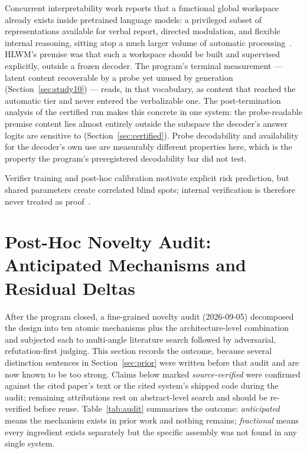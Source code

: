 \documentclass[10pt,a4paper]{article}
\begin{document}
Concurrent interpretability work reports that a functional global workspace
already exists inside pretrained language models: a privileged subset of
representations available for verbal report, directed modulation, and
flexible internal reasoning, sitting atop a much larger volume of automatic
processing~\cite{workspace2026}. HLWM's premise was that such a workspace
should be built and supervised explicitly, outside a frozen decoder. The
program's terminal measurement --- latent content recoverable by a probe yet
unused by generation (Section~\ref{sec:study10}) --- reads, in that
vocabulary, as content that reached the automatic tier and never entered the
verbalizable one. The post-termination analysis of the certified run makes
this concrete in one system: the probe-readable premise content lies almost
entirely outside the subspace the decoder's answer logits are sensitive to
(Section~\ref{sec:certified}). Probe decodability and availability for the
decoder's own use are measurably different properties here, which is the
property the program's preregistered decodability bar did not test.

Verifier training and post-hoc calibration motivate explicit risk prediction,
but shared parameters create correlated blind spots; internal verification is
therefore never treated as proof~\cite{cobbe2021,kadavath2022,guo2017}.

\section{Post-Hoc Novelty Audit: Anticipated Mechanisms and Residual Deltas}
\label{sec:novelty-audit}

After the program closed, a fine-grained novelty audit (2026-09-05) decomposed
the design into ten atomic mechanisms plus the architecture-level combination
and subjected each to multi-angle literature search followed by adversarial,
refutation-first judging. This section records the outcome, because several
distinction sentences in Section~\ref{sec:prior} were written before that
audit and are now known to be too strong. Claims below marked
\emph{source-verified} were confirmed against the cited paper's text or the
cited system's shipped code during the audit; remaining attributions rest on
abstract-level search and should be re-verified before reuse.
Table~\ref{tab:audit} summarizes the outcome: \emph{anticipated} means the
mechanism exists in prior work and nothing remains; \emph{fractional} means
every ingredient exists separately but the specific assembly was not found in
any single system.
\end{document}

